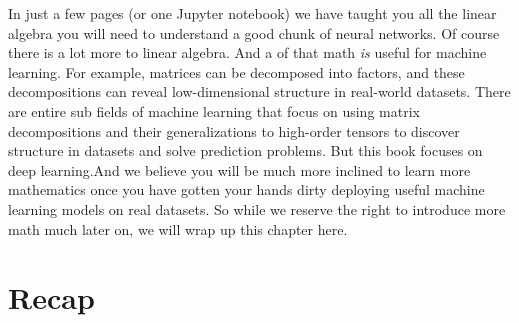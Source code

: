 \documentclass[]{article}
\begin{document}
In just a few pages (or one Jupyter notebook) we have taught you all the linear algebra you will need to understand a good chunk of neural networks. Of course there is a lot more to linear algebra. And a  of that math \textit{is} useful for machine learning. For example, matrices can be decomposed into factors, and these decompositions can reveal low-dimensional structure in real-world datasets. There are entire sub fields of machine learning that focus on using matrix decompositions and their generalizations to high-order tensors to discover structure in datasets and solve prediction problems. But this book focuses on deep learning.And we believe you will be much more inclined to learn more mathematics once you have gotten your hands dirty deploying useful machine learning models on real datasets. So while we reserve the right to introduce more math much later on, we will wrap up this chapter here.

\section{Recap}


\nocite{*}

\printbibliography
\end{document}
